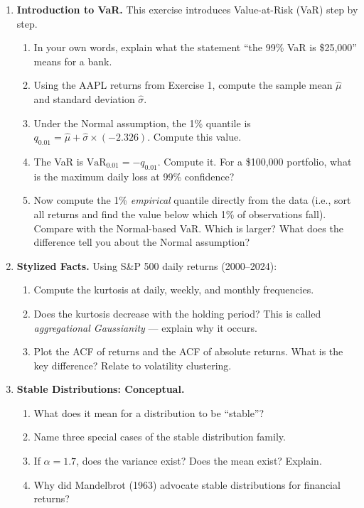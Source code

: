 \documentclass[11pt, a4paper]{article}
\theoremstyle{definition}
\begin{document}
\begin{enumerate}[label=\textbf{E\arabic*.}]
\item \textbf{Introduction to VaR.}
This exercise introduces Value-at-Risk (VaR) step by step.
\begin{enumerate}[label=(\alph*)]
  \item In your own words, explain what the statement ``the 99\% VaR is \$25{,}000'' means for a bank.
  \item Using the AAPL returns from Exercise 1, compute the sample mean $\hat{\mu}$ and standard deviation $\hat{\sigma}$.
  \item Under the Normal assumption, the 1\% quantile is $q_{0.01} = \hat{\mu} + \hat{\sigma} \times (-2.326)$. Compute this value.
  \item The VaR is $\text{VaR}_{0.01} = -q_{0.01}$. Compute it. For a \$100{,}000 portfolio, what is the maximum daily loss at 99\% confidence?
  \item Now compute the 1\% \textit{empirical} quantile directly from the data (i.e., sort all returns and find the value below which 1\% of observations fall). Compare with the Normal-based VaR. Which is larger? What does the difference tell you about the Normal assumption?
\end{enumerate}

\item \textbf{Stylized Facts.}
Using S\&P 500 daily returns (2000--2024):
\begin{enumerate}[label=(\alph*)]
  \item Compute the kurtosis at daily, weekly, and monthly frequencies.
  \item Does the kurtosis decrease with the holding period? This is called \emph{aggregational Gaussianity} — explain why it occurs.
  \item Plot the ACF of returns and the ACF of absolute returns. What is the key difference? Relate to volatility clustering.
\end{enumerate}

\item \textbf{Stable Distributions: Conceptual.}
\begin{enumerate}[label=(\alph*)]
  \item What does it mean for a distribution to be ``stable''?
  \item Name three special cases of the stable distribution family.
  \item If $\alpha = 1.7$, does the variance exist? Does the mean exist? Explain.
  \item Why did Mandelbrot (1963) advocate stable distributions for financial returns?
\end{enumerate}

\end{enumerate}
\end{document}
